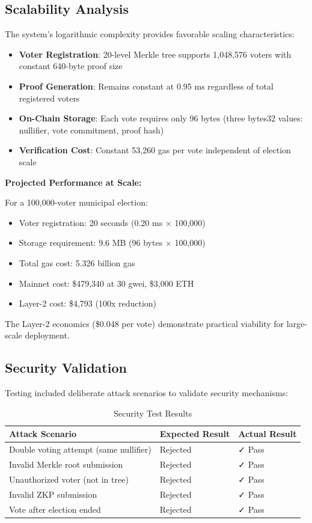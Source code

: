 \documentclass[conference]{IEEEtran}
\begin{document}
\subsection{Scalability Analysis}

The system's logarithmic complexity provides favorable scaling characteristics:

\begin{itemize}
    \item \textbf{Voter Registration}: 20-level Merkle tree supports 1,048,576 voters with constant 640-byte proof size
    \item \textbf{Proof Generation}: Remains constant at 0.95 ms regardless of total registered voters
    \item \textbf{On-Chain Storage}: Each vote requires only 96 bytes (three bytes32 values: nullifier, vote commitment, proof hash)
    \item \textbf{Verification Cost}: Constant 53,260 gas per vote independent of election scale
\end{itemize}

\textbf{Projected Performance at Scale:}

For a 100,000-voter municipal election:
\begin{itemize}
    \item Voter registration: 20 seconds (0.20 ms $\times$ 100,000)
    \item Storage requirement: 9.6 MB (96 bytes $\times$ 100,000)
    \item Total gas cost: 5.326 billion gas
    \item Mainnet cost: \$479,340 at 30 gwei, \$3,000 ETH
    \item Layer-2 cost: \$4,793 (100x reduction)
\end{itemize}

The Layer-2 economics (\$0.048 per vote) demonstrate practical viability for large-scale deployment.

\subsection{Security Validation}

Testing included deliberate attack scenarios to validate security mechanisms:

\begin{table}[H]
\caption{Security Test Results}
\centering
\footnotesize
\begin{tabular}{|p{3.5cm}|p{2cm}|p{1.5cm}|}
\hline
\textbf{Attack Scenario} & \textbf{Expected Result} & \textbf{Actual Result} \\
\hline
Double voting attempt (same nullifier) & Rejected & ✓ Pass \\
Invalid Merkle root submission & Rejected & ✓ Pass \\
Unauthorized voter (not in tree) & Rejected & ✓ Pass \\
Invalid ZKP submission & Rejected & ✓ Pass \\
Vote after election ended & Rejected & ✓ Pass \\
\hline
\end{tabular}
\label{tab:security_tests}
\end{table}
\end{document}
